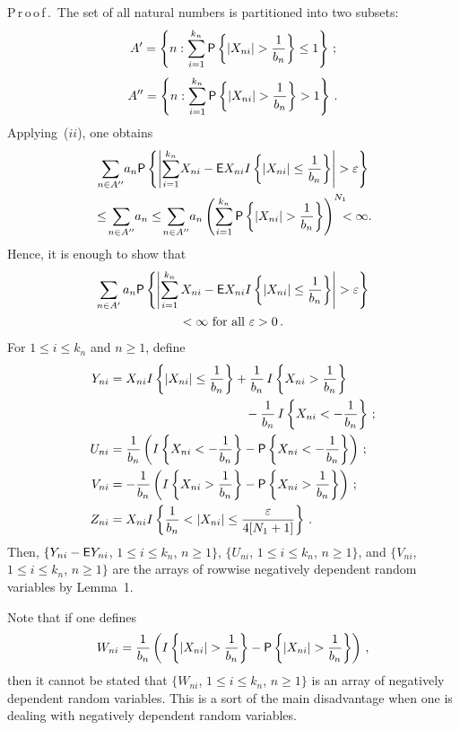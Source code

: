 \begin{multicols}{2}
\noindent 
P\,r\,o\,o\,f\,.\ The set of all natural numbers is partitioned into two subsets:
$$ 
A'=\left\{n : \sum\limits_{i=1}^{k_n} {\sf P}\left\{|X_{ni}|>\fr{1}{b_n}\right\}\le 1\right\} \,;
$$
$$
A''=\left\{n : \sum\limits_{i=1}^{k_n} {\sf P} \left\{|X_{ni}|>\fr{1}{b_n}\right\}> 1\right\}\,. 
$$
Applying~($ii$), one obtains
\begin{multline*}
\sum\limits_{n\in A''} \!a_n {\sf P}\left\{\left| \sum\limits_{i=1}^{k_n} \!X_{ni}- 
{\sf E}X_{ni}I\left\{|X_{ni}|\le \fr{1}{b_n}
\right\}\right|> \varepsilon\right\}
\\
\hspace*{-0.55399pt}{}\le \!\sum\limits_{n\in A''} \!a_n\le \!\sum\limits_{n\in A''}\! a_n \left( 
\sum\limits_{i=1}^{k_n} {\sf P}\left\{|X_{ni}|>\fr{1}{b_n}\right\} \right)^{N_1}\!\!\!\!<\infty. 
\end{multline*}
Hence, it is enough to show that
\begin{multline*}
\sum\limits_{n \in A'} a_n {\sf P}\left\{\left|
\sum\limits_{i=1}^{k_n} X_{ni}- {\sf E}X_{ni}I\left\{|X_{ni}|\le \fr{1}{b_n}\right\}\right|>\varepsilon
\right\}\\
<\infty \mbox{ for all } \varepsilon>0\,. 
\end{multline*}
For $1\le i\le k_n$ and $n\ge 1$, define
\begin{align*}
Y_{ni}&= X_{ni}I\left\{|X_{ni}|
\le \fr{1}{b_n}\right\}+ \fr{1}{b_n}\,I\left\{X_{ni}> \fr{1}{b_n}\right\}\\
&\hspace*{38mm}-\fr{1}{b_n}\,I\left\{X_{ni}< -\fr{1}{b_n}\right\}\,;\\
U_{ni}&= \fr{1}{b_n}\left(I\left\{X_{ni}<-\fr{1}{b_n}\right\}-{\sf P}
\left\{X_{ni}<-\fr{1}{b_n}\right\}\right)\,;\\
V_{ni}&= -\fr{1}{b_n}\left(I\left\{X_{ni}>\fr{1}{b_n}\right\}-{\sf P}\left\{X_{ni}> \fr{1}{b_n}\right\}\right)\,;\\
Z_{ni}&= X_{ni} I\left\{\fr{1}{b_n} <|X_{ni}|\le \fr{\varepsilon}{4[N_1+1]}\right\}\,.
\end{align*}
Then, $\{Y_{ni}-{\sf E}Y_{ni}$, $1\le i\le k_n$, $n\ge 1 \}$, $\{U_{ni}$, 
$1\le i\le k_n$, $n\ge 1 \}$, and $\{V_{ni}$, $1\le i\le
k_n$, $n\ge 1 \}$ are the arrays of rowwise negatively dependent  random variables by Lemma~1.

Note that if one defines
$$ 
W_{ni}= \fr{1}{b_n}\left(I\left\{|X_{ni}|>\fr{1}{b_n}\right\}-{\sf P}
\left\{|X_{ni}|>\fr{1}{b_n}\right\}\right)\,,
$$
then it cannot be stated that $\{W_{ni}$, $1\le i\le k_n$, $n\ge 1 \}$ is an array of negatively dependent random
variables. This is a sort of the main disadvantage when one is 
dealing with negatively dependent random variables.


\end{multicols}
